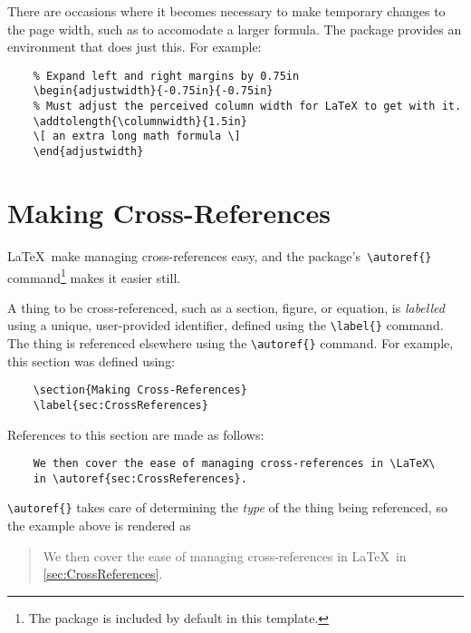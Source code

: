 There are occasions where it becomes necessary to make temporary
changes to the page width, such as to accomodate a larger formula. 
The  package provides an 
environment that does just this.  For example:
\begin{lstlisting}
    % Expand left and right margins by 0.75in
    \begin{adjustwidth}{-0.75in}{-0.75in}
    % Must adjust the perceived column width for LaTeX to get with it.
    \addtolength{\columnwidth}{1.5in}
    \[ an extra long math formula \]
    \end{adjustwidth}
\end{lstlisting}

\section{Making Cross-References}
\label{sec:CrossReferences}

\LaTeX\ make managing cross-references easy, and the 
package's\ \verb+\autoref{}+ command\footnote{%
    The  package is included by default in this
    template.}
makes it easier still. 

A thing to be cross-referenced, such as a section, figure, or equation,
is \emph{labelled} using a unique, user-provided identifier, defined
using the \verb+\label{}+ command.  
The thing is referenced elsewhere using the \verb+\autoref{}+ command.
For example, this section was defined using:
\begin{lstlisting}
    \section{Making Cross-References}
    \label{sec:CrossReferences}
\end{lstlisting}
References to this section are made as follows:
\begin{lstlisting}
    We then cover the ease of managing cross-references in \LaTeX\
    in \autoref{sec:CrossReferences}.
\end{lstlisting}
\verb+\autoref{}+ takes care of determining the \emph{type} of the 
thing being referenced, so the example above is rendered as
\begin{quote}
    We then cover the ease of managing cross-references in \LaTeX\
    in \autoref{sec:CrossReferences}.
\end{quote}

